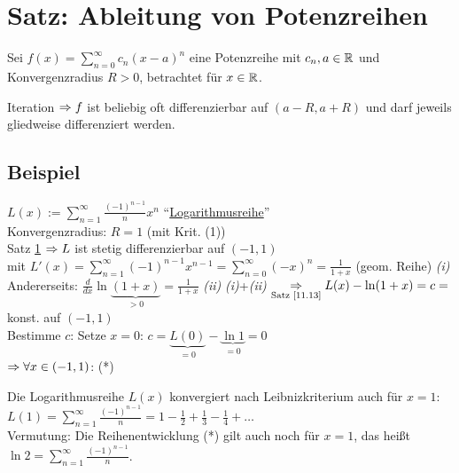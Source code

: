 \section{Satz: Ableitung von Potenzreihen}\label{13.14}
Sei $f(x)=\sum_{n=0}^\infty c_n (x-a)^n$ eine Potenzreihe mit $c_n,a \in \mathbb{R}$ und Konvergenzradius $R>0$, betrachtet für $x \in \mathbb{R}$.\nl
{}\nl
{}
Iteration $\Rightarrow f$ ist beliebig oft differenzierbar auf $(a-R,a+R)$ und darf jeweils gliedweise differenziert werden.

\subsection*{Beispiel}
$L(x) := \sum_{n=1}^\infty \frac{(-1)^{n-1}}{n} x^n$ "`\underline{Logarithmusreihe}"'\\
Konvergenzradius: $R=1$ (mit Krit. (1))\\
Satz \ref{13.14} $\Rightarrow L$ ist stetig differenzierbar auf $(-1,1)$\\
mit $L'(x) = \sum_{n=1}^\infty (-1)^{n-1} x^{n-1} = \sum_{n=0}^\infty (-x)^n = \frac{1}{1+x}$ (geom. Reihe) \emph{(i)}\\
Andererseits: $\frac{d}{dx} \ln\underbrace{(1+x)}_{>0} = \frac{1}{1+x}$ \emph{(ii)}\nl
\emph{(i)}+\emph{(ii)} $\underset{\text{Satz \ref{11.13}}}{\Rightarrow} L(x)-\ln(1+x) = c =$ konst. auf $(-1,1)$\\
Bestimme $c$: Setze $x=0$: $c=\underbrace{L(0)}_{=0}-\underbrace{\ln 1}_{=0}=0$\\
$\Rightarrow \forall x \in (-1,1)$:  (*)\nl
{}\nl
Die Logarithmusreihe $L(x)$ konvergiert nach Leibnizkriterium auch für $x=1$: $L(1)=\sum_{n=1}^\infty \frac{(-1)^{n-1}}{n} = 1 - \frac{1}{2} + \frac{1}{3} - \frac{1}{4} + \ldots$\\
Vermutung: Die Reihenentwicklung (*) gilt auch noch für $x=1$, das heißt $\ln 2 = \sum_{n=1}^\infty \frac{(-1)^{n-1}}{n}$.


